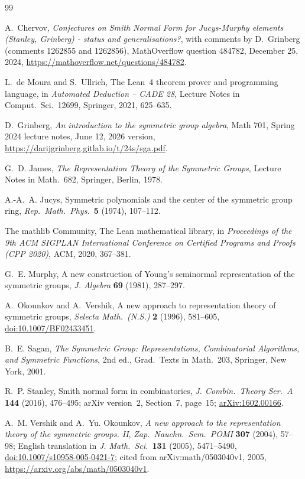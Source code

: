 \documentclass[11pt]{article}
\theoremstyle{remark}
\begin{document}
\bigskip
\begin{thebibliography}{99}

A.~Chervov, \emph{Conjectures on Smith Normal Form for Jucys-Murphy
elements (Stanley, Grinberg) - status and generalisations?}, with comments
by D.~Grinberg (comments 1262855 and 1262856), MathOverflow question 484782, December 25, 2024,
\url{https://mathoverflow.net/questions/484782}.

L.~de Moura and S.~Ullrich, The Lean~4 theorem prover and programming
language, in \emph{Automated Deduction -- CADE 28}, Lecture Notes in Comput.\
Sci.\ 12699, Springer, 2021, 625--635.

D.~Grinberg, \emph{An introduction to the symmetric group algebra},
Math 701, Spring 2024 lecture notes, June 12, 2026 version,
\url{https://darijgrinberg.gitlab.io/t/24s/sga.pdf}.

G.~D. James, \emph{The Representation Theory of the Symmetric Groups},
Lecture Notes in Math.\ 682, Springer, Berlin, 1978.

A.-A.~A. Jucys, Symmetric polynomials and the center of the symmetric group
ring, \emph{Rep.\ Math.\ Phys.}\ \textbf{5} (1974), 107--112.

The mathlib Community, The Lean mathematical library, in \emph{Proceedings
of the 9th ACM SIGPLAN International Conference on Certified Programs and
Proofs (CPP 2020)}, ACM, 2020, 367--381.

G.~E. Murphy, A new construction of Young's seminormal representation of the
symmetric groups, \emph{J. Algebra} \textbf{69} (1981), 287--297.

A.~Okounkov and A.~Vershik, A new approach to representation theory of
symmetric groups, \emph{Selecta Math.\ (N.S.)} \textbf{2} (1996), 581--605,
\href{https://doi.org/10.1007/BF02433451}{doi:10.1007/BF02433451}.

B.~E. Sagan, \emph{The Symmetric Group: Representations, Combinatorial
Algorithms, and Symmetric Functions}, 2nd ed., Grad.\ Texts in Math.\ 203,
Springer, New York, 2001.

R.~P. Stanley, Smith normal form in combinatorics, \emph{J. Combin.\ Theory
Ser.~A} \textbf{144} (2016), 476--495; arXiv version~2, Section~7, page~15; \href{https://arxiv.org/abs/1602.00166}{arXiv:1602.00166}.

A.~M. Vershik and A.~Yu. Okounkov, \emph{A new approach to the representation
theory of the symmetric groups. II}, \emph{Zap.\ Nauchn.\ Sem.\ POMI}
\textbf{307} (2004), 57--98; English translation in \emph{J. Math.\ Sci.}\
\textbf{131} (2005), 5471--5490,
\href{https://doi.org/10.1007/s10958-005-0421-7}{doi:10.1007/s10958-005-0421-7};
cited from arXiv:math/0503040v1, 2005,
\url{https://arxiv.org/abs/math/0503040v1}.


\end{thebibliography}
\end{document}
